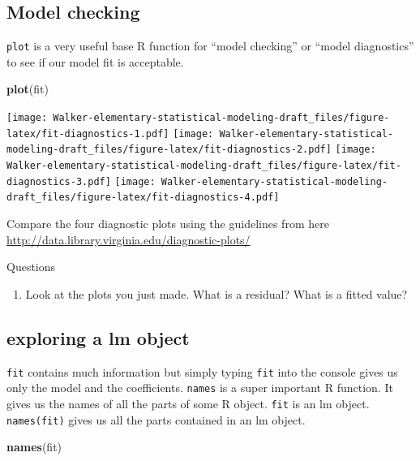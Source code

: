 \documentclass[]{book}
\newenvironment{Shaded}{\begin{snugshade}}{\end{snugshade}}
\newcommand{\KeywordTok}[1]{\textcolor[rgb]{0.13,0.29,0.53}{\textbf{#1}}}
\newcommand{\NormalTok}[1]{#1}
\providecommand{\tightlist}{%
  \setlength{\itemsep}{0pt}\setlength{\parskip}{0pt}}
\theoremstyle{definition}
\theoremstyle{definition}
\theoremstyle{definition}
\theoremstyle{remark}
\begin{document}
\subsection{Model checking}

\texttt{plot} is a very useful base R function for ``model checking'' or
``model diagnostics'' to see if our model fit is acceptable.

\begin{Shaded}
\begin{Highlighting}[]
\KeywordTok{plot}\NormalTok{(fit)}
\end{Highlighting}
\end{Shaded}

\texttt{[image: Walker-elementary-statistical-modeling-draft\_files/figure-latex/fit-diagnostics-1.pdf]}
\texttt{[image: Walker-elementary-statistical-modeling-draft\_files/figure-latex/fit-diagnostics-2.pdf]}
\texttt{[image: Walker-elementary-statistical-modeling-draft\_files/figure-latex/fit-diagnostics-3.pdf]}
\texttt{[image: Walker-elementary-statistical-modeling-draft\_files/figure-latex/fit-diagnostics-4.pdf]}

Compare the four diagnostic plots using the guidelines from here
\url{http://data.library.virginia.edu/diagnostic-plots/}

Questions

\begin{enumerate}
\def\labelenumi{\arabic{enumi}.}
\setcounter{enumi}{5}
\tightlist
\item
  Look at the plots you just made. What is a residual? What is a fitted
  value?
\end{enumerate}

\subsection{exploring a lm object}\label{exploring-a-lm-object}

\texttt{fit} contains much information but simply typing \texttt{fit}
into the console gives us only the model and the coefficients.
\texttt{names} is a super important R function. It gives us the names of
all the parts of some R object. \texttt{fit} is an lm object.
\texttt{names(fit)} gives us all the parts contained in an lm object.

\begin{Shaded}
\begin{Highlighting}[]
\KeywordTok{names}\NormalTok{(fit)}
\end{Highlighting}
\end{Shaded}
\end{document}
